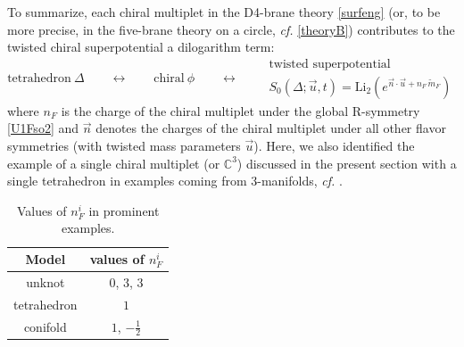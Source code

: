 \documentclass[hyper,letterpaper]{JHEP3}
\newcommand{\C}{{\mathbb C}}
\begin{document}
To summarize, each chiral multiplet in the D4-brane theory \eqref{surfeng}
(or, to be more precise, in the five-brane theory on a circle, {\it cf.} \eqref{theoryB})
contributes to the twisted chiral superpotential a dilogarithm term:
$$
\text{tetrahedron}~\Delta
\qquad \leftrightarrow \qquad
\text{chiral}~\phi
\qquad \leftrightarrow \qquad
\begin{array}{l}
\text{twisted superpotential} \\[.1cm]
S_0 (\Delta; \vec u, t) = \textrm{Li}_2( e^{\vec n \cdot \vec u + n_F \, \tilde m_F} )
\end{array}
$$
where $n_F$ is the charge of the chiral multiplet under the global R-symmetry \eqref{U1Fso2}
and $\vec n$ denotes the charges of the chiral multiplet under all other flavor symmetries (with twisted mass parameters $\vec u$).
Here, we also identified the example of a single chiral multiplet (or $\C^3$) discussed in the present section with
a single tetrahedron in examples coming from 3-manifolds, {\it cf.} \cite{DGH,DGSdual,abmodel,DGG,CCV}.


\begin{table}[h]
\centering
\begin{tabular}{|@{$\Bigm|$}c|c@{$\Bigm|$}|}
\hline
\rule{0pt}{5mm}
\textbf{Model} & values of $n_F^i$  \\[3pt]
\hline
\hline
\rule{0pt}{5mm}
unknot & $0$, $3$, $3$   \\[3pt]
\hline
\rule{0pt}{5mm}
tetrahedron & $1$   \\[3pt]
\hline
\rule{0pt}{5mm}
conifold & $1$, $- \frac{1}{2}$  \\[3pt]
\hline
\end{tabular}
\caption{Values of $n_F^i$ in prominent examples. \label{tab-nF} }
\end{table}
\end{document}
